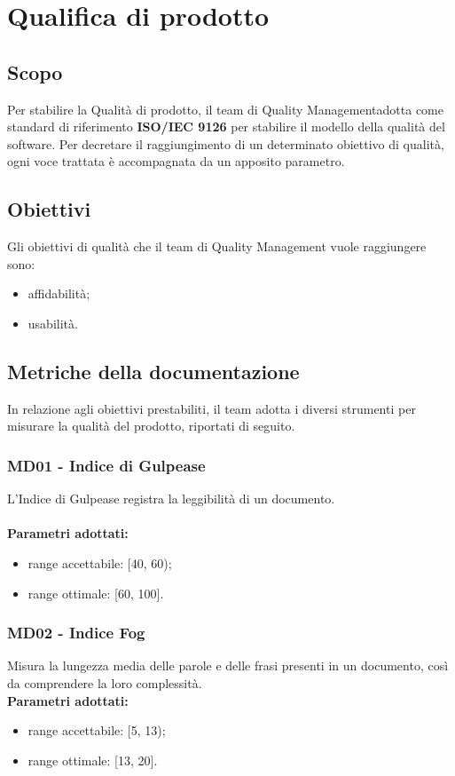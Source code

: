 \section{Qualifica di prodotto}
\subsection{Scopo}
Per stabilire la Qualità di prodotto, il team di Quality Management\glo adotta come standard di riferimento \textbf{ISO/IEC 9126} per stabilire il modello della qualità del software. Per decretare il raggiungimento di un determinato obiettivo di qualità, ogni voce trattata è accompagnata da un apposito parametro.
\subsection{Obiettivi}
Gli obiettivi di qualità che il team di Quality Management vuole raggiungere sono:
\begin{itemize}
\item affidabilità;
\item usabilità.
\end{itemize}
\subsection{Metriche della documentazione}
In relazione agli obiettivi prestabiliti, il team adotta i diversi strumenti per misurare la qualità del prodotto, riportati di seguito.
\subsubsection{MD01 - Indice di Gulpease}
L'Indice di Gulpease registra la leggibilità di un documento. \\ \\ 
\textbf{Parametri adottati:} 
\begin{itemize}
\item range accettabile: [40, 60);
\item range ottimale: [60, 100].
\end{itemize}

\subsubsection{MD02 - Indice Fog}
Misura la lungezza media delle parole e delle frasi presenti in un documento, così da comprendere la loro complessità.\\
\textbf{Parametri adottati:} 
\begin{itemize}
\item range accettabile: [5, 13);
\item range ottimale: [13, 20].
\end{itemize}

